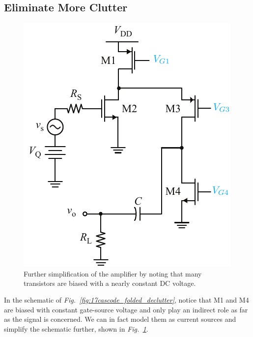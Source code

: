 \subsection{Eliminate More Clutter}
\begin{figure}[tb]
\centering
\includegraphics[scale=1]{18cascode_folded_dc}
\caption{Further simplification of the amplifier by noting that many transistors are biased with a nearly constant DC voltage.}
\label{fig:18cascode_folded_dc}
\end{figure}
In the schematic of \emph{Fig.~\ref{fig:17cascode_folded_declutter}}, notice that M1 and M4 are biased with constant gate-source voltage and only play an indirect role as far as the signal is concerned.  We can in fact model them as current sources and simplify the schematic further, shown in \emph{Fig.~\ref{fig:18cascode_folded_dc}}.
